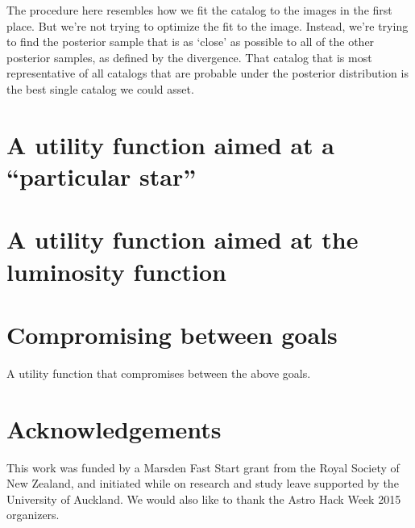 \documentclass[a4paper,fleqn,usenatbib]{mnras}
\begin{document}
The procedure here resembles how we fit the catalog to the images in the
first place. But we're not trying to optimize the fit to the image. Instead,
we're trying to find the posterior sample that is as `close' as possible to
all of the other posterior samples, as defined by the divergence. That catalog
that is most representative of all catalogs that are probable under the
posterior distribution is the best single catalog we could asset.

\section{A utility function aimed at a ``particular star''}


\section{A utility function aimed at the luminosity function}


\section{Compromising between goals}
A utility function that compromises between the above goals.



\section*{Acknowledgements}
This work was funded by a Marsden Fast Start grant from the Royal Society of
New Zealand, and initiated while on research and study leave supported by
the University of Auckland. We would also like to thank the Astro Hack Week
2015 organizers.












\bsp	%
\label{lastpage}
\end{document}
